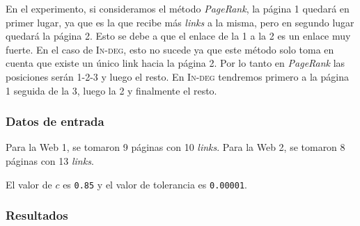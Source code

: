 			En el experimento, si consideramos el método \emph{PageRank}, la página 1 quedará en primer lugar, ya que es la que recibe más \emph{links} a la misma, pero en segundo lugar quedará la página 2. Esto se debe a que el enlace de la 1 a la 2 es un enlace muy fuerte. En el caso de \textsc{In-deg}, esto no sucede ya que este método solo toma en cuenta que existe un único link hacia la página 2. Por lo tanto en \emph{PageRank} las posiciones serán 1-2-3 y luego el resto. En \textsc{In-deg} tendremos primero a la página 1 seguida de la 3, luego la 2 y finalmente el resto.

			\subsubsection*{Datos de entrada}
			Para la Web 1, se tomaron 9 páginas con 10 \emph{links}. Para la Web 2, se tomaron 8 páginas con 13 \emph{links}.  

			El valor de $c$ es \texttt{0.85} y el valor de tolerancia es \texttt{0.00001}. 
			 		
			\subsubsection*{Resultados}

